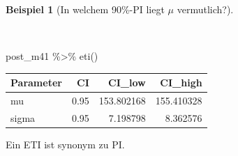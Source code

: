 \documentclass[
  a4paper,
  DIV=11]{scrreprt}
\newenvironment{Shaded}{\begin{snugshade}}{\end{snugshade}}
\newcommand{\FunctionTok}[1]{\textcolor[rgb]{0.28,0.35,0.67}{#1}}
\newcommand{\NormalTok}[1]{\textcolor[rgb]{0.00,0.23,0.31}{#1}}
\newcommand{\SpecialCharTok}[1]{\textcolor[rgb]{0.37,0.37,0.37}{#1}}
\theoremstyle{definition}
\newtheorem{example}{Beispiel}[chapter]
\theoremstyle{remark}
\begin{document}
\leavevmode{}%
\begin{example}[In welchem 90\%-PI liegt \(\mu\)
vermutlich?]\label{exm-kung4}

~

\begin{Shaded}
\begin{Highlighting}[]
\NormalTok{post\_m41 }\SpecialCharTok{\%\textgreater{}\%} 
  \FunctionTok{eti}\NormalTok{()}
\end{Highlighting}
\end{Shaded}

\begin{longtable}[]{@{}lrrr@{}}
\toprule()
Parameter & CI & CI\_low & CI\_high \\
\midrule()
\endhead
mu & 0.95 & 153.802168 & 155.410328 \\
sigma & 0.95 & 7.198798 & 8.362576 \\
\bottomrule()
\end{longtable}

Ein ETI ist synonym zu PI.

\end{example}
\end{document}
